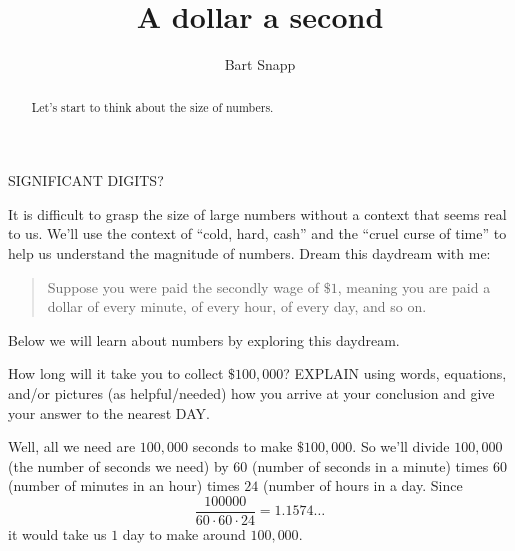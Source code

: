 \documentclass[nooutcomes,noauthor,hints]{ximera}
\title{A dollar a second}
\author{Bart Snapp}
\begin{document}
\begin{abstract}
  Let's start to think about the size of numbers.
\end{abstract}
\maketitle

\begin{listOutcomes}
\item SIGNIFICANT DIGITS?
\end{listOutcomes}


It is difficult to grasp the size of large numbers without a context
that seems real to us. We'll use the context of ``cold, hard, cash''
and the ``cruel curse of time'' to help us understand the magnitude of
numbers.  Dream this daydream with me:
\begin{quote}
  Suppose you were paid the secondly wage of $\$1$, meaning you are
  paid a dollar  of every minute, of every hour, of
  every day, and so on.
\end{quote}

Below we will learn about numbers by exploring this daydream.



\mynewpage

\begin{question}
  How long will it take you to collect $\$100,000$? EXPLAIN using
  words, equations, and/or pictures (as helpful/needed) how you arrive
  at your conclusion and give your answer to the nearest DAY.
  \begin{freeResponse}
    Well, all we need are $100,000$ seconds to make $\$100,000$. So
    we'll divide $100,000$ (the number of seconds we need) by $60$
    (number of seconds in a minute) times $60$ (number of minutes in
    an hour) times $24$ (number of hours in a day.  Since
    \[
    \frac{100000}{60\cdot 60\cdot 24} = 1.1574\dots
    \]
    it would take us $1$ day to make around $100,000$.
  \end{freeResponse}
\end{question}
\mynewpage


\end{document}
